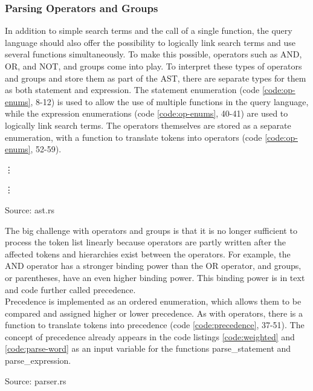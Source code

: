 \subsubsection{Parsing Operators and Groups}
In addition to simple search terms and the call of a single function, the query language should also offer the possibility to logically link search terms and use several functions simultaneously. To make this possible, operators such as AND, OR, and NOT, and groups come into play. To interpret these types of operators and groups and store them as part of the \ac{AST}, there are separate types for them as both statement and expression. The statement enumeration (code \ref{code:op-enums}, 8-12) is used to allow the use of multiple functions in the query language, while the expression enumerations (code \ref{code:op-enums}, 40-41) are used to logically link search terms. The operators themselves are stored as a separate enumeration, with a function to translate tokens into operators (code \ref{code:op-enums}, 52-59).
\begin{codeenv}
    \label{code:op-enums}
    
    \vdots
    
    \vdots
    
    \centerline{Source: ast.rs}
\end{codeenv}
The big challenge with operators and groups is that it is no longer sufficient to process the token list linearly because operators are partly written after the affected tokens and hierarchies exist between the operators. For example, the AND operator has a stronger binding power than the OR operator, and groups, or parentheses, have an even higher binding power. This binding power is in text and code further called precedence.\\
Precedence is implemented as an ordered enumeration, which allows them to be compared and assigned higher or lower precedence. As with operators, there is a function to translate tokens into precedence (code \ref{code:precedence}, 37-51). The concept of precedence already appears in the code listings \ref{code:weighted} and \ref{code:parse-word} as an input variable for the functions parse\_statement and parse\_expression.
\begin{codeenv}
    \label{code:precedence}
    
    \centerline{Source: parser.rs}
\end{codeenv}
